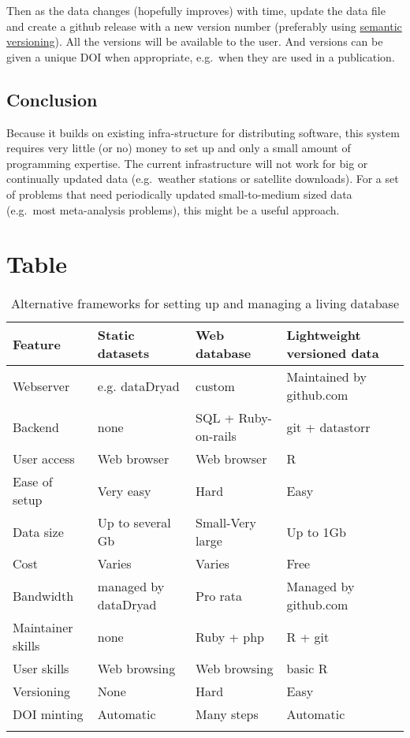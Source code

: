 \documentclass[a4paper,11pt]{article}
\begin{document}
Then as the data changes (hopefully improves) with time, update the data
file and create a github release with a new version number (preferably
using \href{http://semver.org/}{semantic versioning}). All the versions
will be available to the user. And versions can be given a unique DOI
when appropriate, e.g.~when they are used in a publication.

\subsection{Conclusion}

Because it builds on existing infra-structure for distributing software,
this system requires very little (or no) money to set up and only a
small amount of programming expertise. The current infrastructure will
not work for big or continually updated data (e.g.~weather stations or
satellite downloads). For a set of problems that need periodically
updated small-to-medium sized data (e.g.~most meta-analysis problems),
this might be a useful approach.

\section{Table}

\begin{table}[h!]
\centering
\caption{Alternative frameworks for setting up and managing a living database}
{\footnotesize
\vspace{1cm}
  \begin{tabular}{p{2.5cm}p{3.5cm}p{3.5cm}p{4cm}}
  \hline
  \textbf{Feature} & \textbf{Static datasets}& \textbf{Web database} & \textbf{Lightweight versioned data}\\
  \hline
   Webserver        & e.g. dataDryad & custom                          &  Maintained by github.com\\
   Backend          & none & SQL + Ruby-on-rails 			& git + datastorr \\
   User access      & Web browser & Web browser 				    & R \\
   Ease of setup    & Very easy & Hard 							& Easy\\ %
   Data size        & Up to several Gb & Small-Very large 				& Up to 1Gb\\
   Cost             & Varies & Varies  						& Free \\
   Bandwidth        &managed by dataDryad & Pro rata 						& Managed by github.com\\
   Maintainer skills &none & Ruby + php 					& R + git \\
   User skills      &Web browsing& Web browsing  					& basic R \\
   Versioning       &None& Hard 							& Easy \\
   DOI minting      &Automatic & Many steps 					& Automatic \\
  \hline 
  \\
 
  \end{tabular}
  } 
\label{tab:sql_v_versioneddata}
\end{table}
\end{document}
